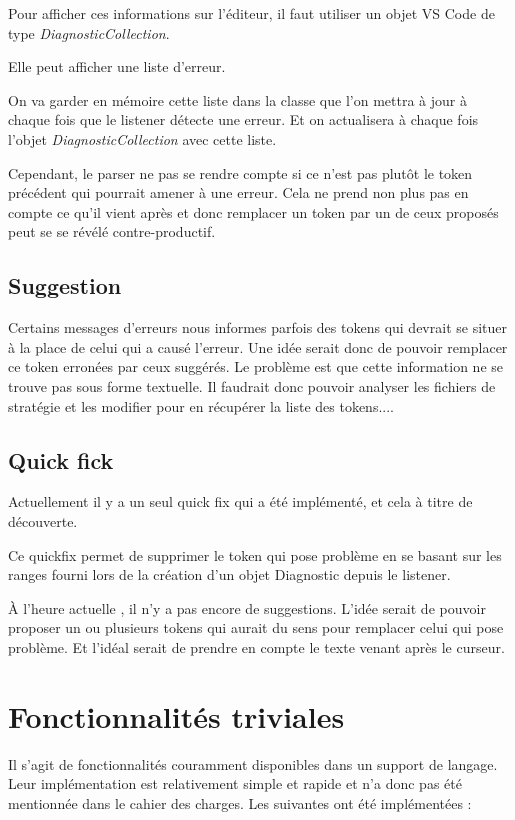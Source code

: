 \documentclass[
    iict, %
    il, %
]{heig-tb}
\begin{document}
Pour afficher ces informations sur l'éditeur, il faut utiliser un objet VS Code de type \emph{DiagnosticCollection}.

Elle peut afficher une liste d'erreur.

On va garder en mémoire cette liste dans la classe que l'on mettra à jour à chaque fois que le listener détecte une erreur.
Et on actualisera à chaque fois l'objet \emph{DiagnosticCollection} avec cette liste.

Cependant, le parser ne pas se rendre compte si ce n'est pas plutôt le token précédent qui pourrait amener à une erreur.
Cela ne prend non plus pas en compte ce qu'il vient après et donc remplacer un token par un de ceux proposés peut se se révélé contre-productif.

\subsection{Suggestion}
Certains messages d'erreurs nous informes parfois des tokens qui devrait se situer à la place de celui qui a causé l'erreur.
Une idée serait donc de pouvoir remplacer ce token erronées par ceux suggérés.
Le problème est que cette information ne se trouve pas sous forme textuelle.
Il faudrait donc pouvoir analyser les fichiers de stratégie et les modifier pour en récupérer la liste des tokens....


\subsection{Quick fick}

Actuellement il y a un seul quick fix qui a été implémenté, et cela à titre de découverte.

Ce quickfix permet de supprimer le token qui pose problème en se basant sur les ranges fourni lors de la création d'un objet Diagnostic depuis le listener.

À l'heure actuelle , il n'y a pas encore de suggestions. L'idée serait de pouvoir proposer un ou plusieurs tokens qui aurait du sens pour remplacer celui qui pose problème.
Et l'idéal serait de prendre en compte le texte venant après le curseur. %

\section{Fonctionnalités triviales}
Il s'agit de fonctionnalités couramment disponibles dans un support de langage. Leur implémentation est relativement simple et rapide et n'a donc pas été mentionnée dans le cahier des charges.
Les suivantes ont été implémentées :
\end{document}
